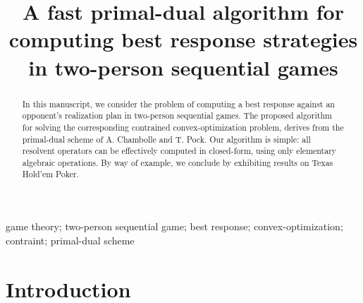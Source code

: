 \documentclass[a4paper,10pt,journal]{IEEEtran}
\begin{document}
\title{A fast primal-dual algorithm for computing best response strategies in two-person sequential games}


\author{}


\maketitle

\begin{abstract}
% 
In this manuscript, we consider the problem of computing a best response against an opponent's realization plan in two-person sequential games.
The proposed algorithm for solving the corresponding contrained convex-optimization problem, derives from the primal-dual scheme of A. Chambolle and T. Pock.
Our algorithm is simple: all resolvent operators can be effectively computed in closed-form, using only elementary algebraic operations.
By way of example, we conclude by exhibiting results on Texas Hold'em Poker.
\end{abstract}


\begin{IEEEkeywords}
  game theory; two-person sequential game; best response; convex-optimization; contraint; primal-dual scheme
\end{IEEEkeywords}

\section{Introduction}
\end{document}
